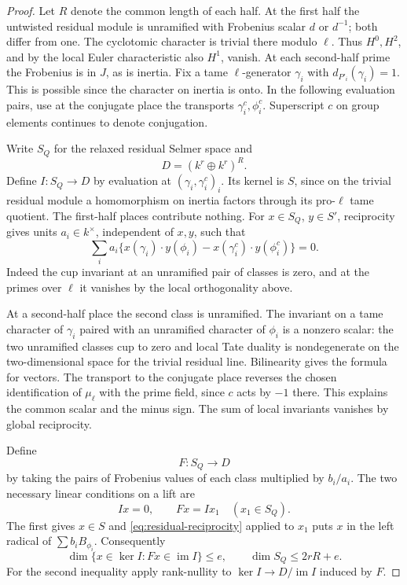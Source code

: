 \begin{proof}
Let \(R\) denote the common length of each half. At the first
half the untwisted residual module is unramified with Frobenius
scalar \(d\) or \(d^{-1}\); both differ from one. The
cyclotomic character is trivial there modulo \(\ell\).
Thus \(H^0,H^2\), and by the local Euler characteristic also
\(H^1\), vanish. At each second-half prime the Frobenius is
in \(J\), as is inertia. Fix a tame \(\ell\)-generator
\(\gamma_i\) with \(d_{P'_i}(\gamma_i)=1\). This is possible
since the character on inertia is onto. In the following
evaluation pairs, use at the conjugate place the transports
\(\gamma_i^c,\phi_i^c\). Superscript \(c\) on group elements
continues to denote conjugation.

Write \(S_Q\) for the relaxed residual Selmer space and
\[
 D=(k^r\oplus k^r)^R.
\]
Define \(I:S_Q\to D\) by evaluation
at \((\gamma_i,\gamma_i^c)_i\). Its kernel is \(S\), since
on the trivial residual module a homomorphism on inertia
factors through its pro-\(\ell\) tame quotient. The first-half
places contribute nothing. For \(x\in S_Q\), \(y\in S'\),
reciprocity gives units \(a_i\in k^\times\), independent of
\(x,y\), such that
\begin{equation}\label{eq:residual-reciprocity}
 \sum_i a_i\{x(\gamma_i)\cdot y(\phi_i)
             -x(\gamma_i^c)\cdot y(\phi_i^c)\}=0 .
\end{equation}
Indeed the cup invariant at an unramified pair of classes is
zero, and at the primes over \(\ell\) it vanishes by the local
orthogonality above.

At a second-half place the second class
is unramified. The invariant on a tame character of
\(\gamma_i\) paired with an unramified character of \(\phi_i\)
is a nonzero scalar: the two unramified classes cup to zero
and local Tate duality is nondegenerate on the two-dimensional
space for the trivial residual line. Bilinearity gives the
formula for vectors. The transport to the conjugate place
reverses the chosen identification of \(\mu_\ell\) with the
prime field, since \(c\) acts by \(-1\) there. This explains
the common scalar and the minus sign. The sum of local
invariants vanishes by global reciprocity.

Define
\[
 F:S_Q\to D
\]
by taking the pairs of Frobenius
values of each class multiplied by \(b_i/a_i\). The two necessary linear conditions on a lift are
\[
 Ix=0,\qquad Fx=Ix_1\quad(x_1\in S_Q).
\]
The first gives \(x\in S\) and \eqref{eq:residual-reciprocity} applied
to \(x_1\) puts \(x\) in the left radical of
\(\sum b_i B_{\phi_i}\). Consequently
\begin{equation}\label{eq:residual-pencil}
  \dim\{x\in\ker I: Fx\in\operatorname{im}I\}\le e,
  \qquad \dim S_Q\le 2rR+e .
\end{equation}
For the second inequality apply rank-nullity to
\(\ker I\to D/\operatorname{im}I\) induced by \(F\).


\end{proof}
